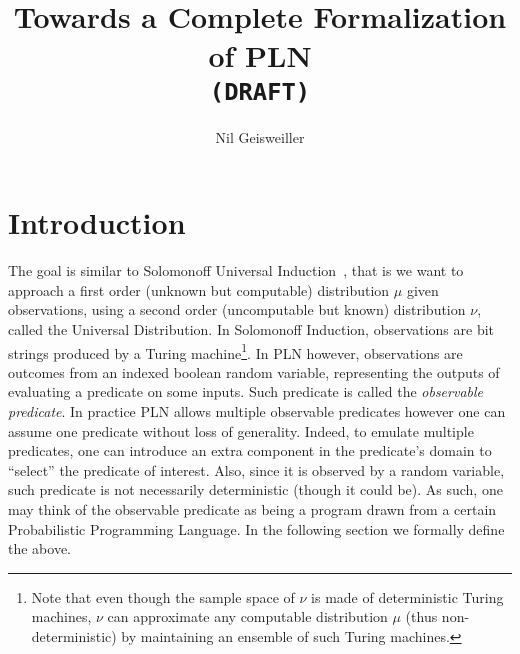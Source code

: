 \documentclass[]{article}
\begin{document}
\newcommand{\nuPLN}{\nu\textup{PLN}}
\newcommand{\Bool}{\textup{Bool}}
\newcommand{\T}{\texttt{True}}
\newcommand{\F}{\texttt{False}}
\newcommand{\Domain}{\mathcal{D}}
\newcommand{\Subsetdom}{\mathcal{S}}
\newcommand{\Predicate}{\mathcal{P}}
\newcommand{\Language}{\mathcal{L}}
\newcommand{\Bernouilli}{\mathcal{B}}
\newcommand{\Bernouillip}{\mathcal{B}_p}
\newcommand{\Field}{\mathcal{F}}
\newcommand{\Model}{M}
\newcommand{\Datax}{D_x}
\newcommand{\DataxD}{D_{x\in\Domain}}
\newcommand{\DataS}{D_{\Subsetdom}}
\newcommand{\STV}[2]{<\!#1, #2\!>}
\newcommand{\limp}{\Rightarrow}
\newcommand{\Nat}{\mathbb{N}}
\newcommand{\anymu}{\hat{\mu}}
\newcommand{\anyomega}{\hat{\omega}}

\title{Towards a Complete Formalization of PLN\\
  \texttt{(DRAFT)}} \author{Nil Geisweiller}
\maketitle

\section{Introduction}
The goal is similar to Solomonoff Universal Induction~\cite{TODO},
that is we want to approach a first order (unknown but computable)
distribution $\mu$ given observations, using a second order
(uncomputable but known) distribution $\nu$, called the Universal
Distribution.  In Solomonoff Induction, observations are bit strings
produced by a Turing machine\footnote{Note that even though the sample
space of $\nu$ is made of deterministic Turing machines, $\nu$ can
approximate any computable distribution $\mu$ (thus non-deterministic)
by maintaining an ensemble of such Turing machines.}.  In PLN however,
observations are outcomes from an indexed boolean random variable,
representing the outputs of evaluating a predicate on some inputs.
Such predicate is called the \emph{observable predicate}.  In practice
PLN allows multiple observable predicates however one can assume one
predicate without loss of generality.  Indeed, to emulate multiple
predicates, one can introduce an extra component in the predicate's
domain to ``select'' the predicate of interest.  Also, since it is
observed by a random variable, such predicate is not necessarily
deterministic (though it could be).  As such, one may think of the
observable predicate as being a program drawn from a certain
Probabilistic Programming Language.  In the following section we
formally define the above.
\end{document}
